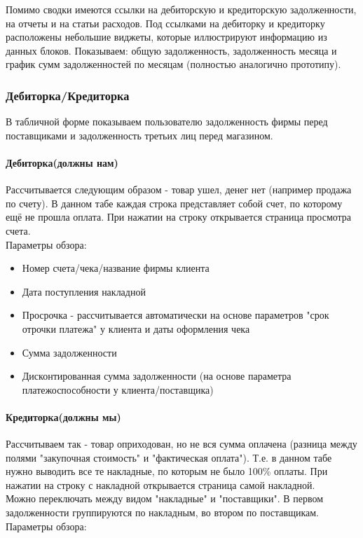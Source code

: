 \documentclass[DIV=calc, paper=a4, fontsize=11pt]{scrartcl} %
\begin{document}
Помимо сводки имеются ссылки на дебиторскую и кредиторскую задолженности, на отчеты и на статьи расходов. Под ссылками на дебиторку и кредиторку расположены небольшие виджеты, которые иллюстрируют информацию из данных блоков. Показываем: общую задолженность, задолженность месяца и график сумм задолженностей по месяцам (полностью аналогично прототипу).


\subsubsection{Дебиторка/Кредиторка}

В табличной форме показываем пользователю задолженность фирмы перед поставщиками и задолженность третьих лиц перед магазином.

\paragraph{Дебиторка(должны нам)}
Рассчитывается следующим образом - товар ушел, денег нет (например продажа по счету). В данном табе каждая строка представляет собой счет, по которому ещё не прошла оплата. При нажатии на строку открывается страница просмотра счета.
\\[0.5cm]
Параметры обзора:

\begin{itemize}
	\item Номер счета/чека/название фирмы клиента
	\item Дата поступления накладной
	\item Просрочка - рассчитывается автоматически на основе параметров "срок отрочки платежа" у клиента и даты оформления чека
	\item Сумма задолженности
	\item Дисконтированная сумма задолженности (на основе параметра платежоспособности у клиента/поставщика)
\end{itemize}

\paragraph{Кредиторка(должны мы)}
Рассчитываем так - товар оприходован, но не вся сумма оплачена (разница между полями "закупочная стоимость" и "фактическая оплата"). Т.е. в данном табе нужно выводить все те накладные, по которым не было 100\% оплаты. При нажатии на строку с накладной открывается страница самой накладной.
\\[0.5cm]
Можно переключать между видом "накладные" и "поставщики". В первом задолженности группируются по накладным, во втором по поставщикам. 
\\[0.5cm]
Параметры обзора:
\end{document}
